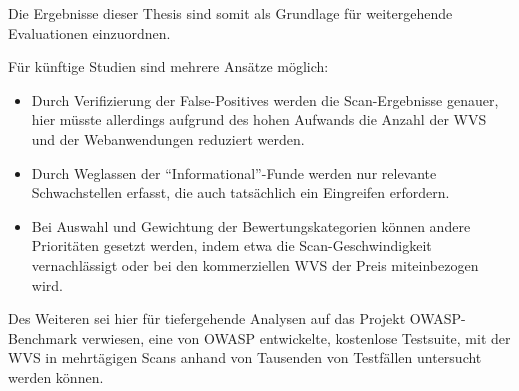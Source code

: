 \documentclass[12pt,oneside,a4paper,parskip,pointlessnumbers]{scrbook}
\begin{document}
Die Ergebnisse dieser Thesis sind somit als Grundlage für weitergehende Evaluationen einzuordnen.

Für künftige Studien sind mehrere Ansätze möglich:
\begin{itemize}
  \item Durch Verifizierung der False-Positives werden die Scan-Ergebnisse genauer, hier müsste allerdings aufgrund des hohen Aufwands die Anzahl der WVS und der Webanwendungen reduziert werden.
  \item Durch Weglassen der ``Informational''-Funde werden nur relevante Schwachstellen erfasst, die auch tatsächlich ein Eingreifen erfordern.
  \item Bei Auswahl und Gewichtung der Bewertungskategorien können andere Prioritäten gesetzt werden, indem etwa die Scan-Geschwindigkeit vernachlässigt oder bei den kommerziellen WVS der Preis miteinbezogen wird.
\end{itemize}
Des Weiteren sei hier für tiefergehende Analysen auf das Projekt OWASP-Benchmark \cite{OWASPbench} verwiesen, eine von OWASP entwickelte, kostenlose Testsuite, mit der WVS in mehrtägigen Scans anhand von Tausenden von Testfällen untersucht werden können.








\cleardoublepage
{}
{}
\printbibliography[title=Quellenverzeichnis]

\appendix
\end{document}

